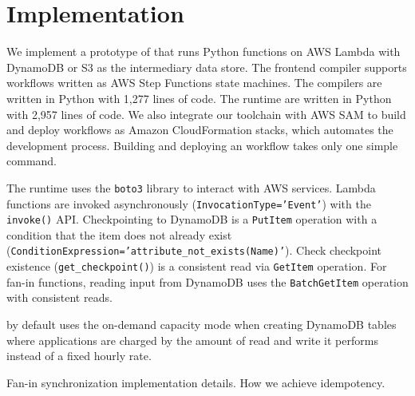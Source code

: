 \section{Implementation}\label{sec:impl}

We implement a prototype of \name{} that runs Python functions on AWS Lambda
with DynamoDB or S3 as the intermediary data store. The frontend compiler
supports workflows written as AWS Step Functions state machines. The compilers
are written in Python with 1,277 lines of code. The runtime are written in
Python with 2,957 lines of code. We also integrate our toolchain with AWS SAM
to build and deploy \name{} workflows as Amazon CloudFormation stacks, which
automates the development process. Building and deploying an \name{} workflow
takes only one simple command.

The runtime uses the \texttt{boto3} library to interact with AWS services.
Lambda functions are invoked asynchronously (\texttt{InvocationType='Event'})
with the \texttt{invoke()} API. Checkpointing to DynamoDB is a
\texttt{PutItem} operation with a condition that the item does not already
exist (\texttt{ConditionExpression='attribute\_not\_exists(Name)'}). Check
checkpoint existence (\texttt{get\_checkpoint()}) is a consistent read via
\texttt{GetItem} operation. For fan-in functions, reading input from DynamoDB
uses the \texttt{BatchGetItem} operation with consistent reads.

\name{} by default uses the on-demand capacity mode when creating DynamoDB
tables where applications are charged by the amount of read and write it
performs instead of a fixed hourly rate.


Fan-in synchronization implementation details. How we achieve idempotency.



